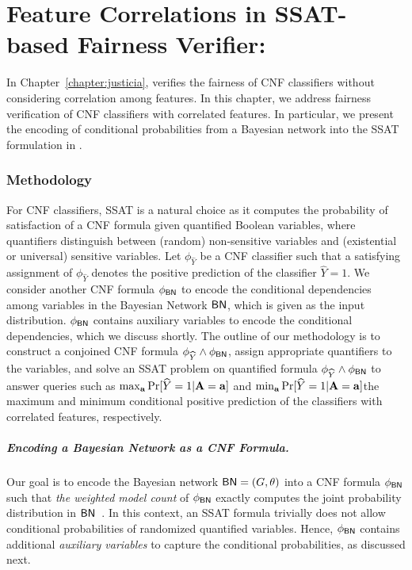 \appendix

\chapter{Feature Correlations in SSAT-based Fairness Verifier: {\justicia}}
\label{chapter:CNF_feature_correlation}
In Chapter~\ref{chapter:justicia}, {\justicia} verifies the fairness of CNF classifiers without considering correlation among features. In this chapter, we address fairness verification of CNF classifiers with correlated features. In particular, we present the encoding of conditional probabilities from a Bayesian network into the SSAT formulation in {\justicia}. 







\subsection*{Methodology}
For CNF classifiers, SSAT is a natural choice as it computes the probability of satisfaction of a CNF formula  given quantified Boolean variables, where quantifiers distinguish between (random) non-sensitive variables and (existential or universal) sensitive variables. Let $ \phi_{\widehat{Y}} $ be a CNF classifier such that a satisfying assignment of $ \phi_{\widehat{Y}} $ denotes the positive prediction of the classifier $ \widehat{Y} = 1 $. We consider another CNF formula $ \phi_{\mathsf{BN}} $ to encode the conditional dependencies among variables in the Bayesian Network $ \mathsf{BN} $, which is given as the input distribution. $ \phi_{\mathsf{BN}} $ contains auxiliary variables to encode the conditional dependencies, which we discuss shortly. The outline of our methodology is to construct a conjoined CNF formula $ \phi_{\widehat{Y}} \wedge \phi_{\mathsf{BN}} $, assign appropriate quantifiers to the variables, and solve an SSAT problem on quantified formula $ \phi_{\widehat{Y}} \wedge \phi_{\mathsf{BN}} $ to answer queries such as $ \max_{\mathbf{a}} \Pr[\widehat{Y} = 1 | \mathbf{A} = \mathbf{a}] $ and $ \min_{\mathbf{a}} \Pr[\widehat{Y} = 1 | \mathbf{A} = \mathbf{a}] $\textemdash the maximum and minimum conditional positive prediction of the classifiers with correlated features, respectively.




\paragraph{Encoding a Bayesian Network as a CNF Formula.}\label{sec:BN_to_CNF}
Our goal is to encode the Bayesian network $ \mathsf{BN} = (G, \theta) $ into a CNF formula $ \phi_{\mathsf{BN}} $ such that \textit{the weighted model count} of $ \phi_{\mathsf{BN}} $ exactly computes the joint probability distribution in $ \mathsf{BN} $~\cite{chavira2008probabilistic}.  In this context, an SSAT formula trivially does not allow conditional probabilities of randomized quantified variables. Hence, $ \phi_{\mathsf{BN}} $ contains additional \textit{auxiliary variables} to capture the conditional probabilities, as discussed next.


